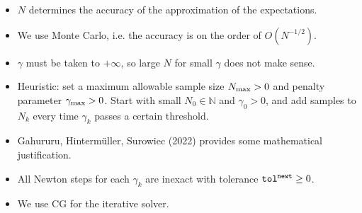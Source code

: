 \documentclass[aspectratio=169,xcolor=dvipsnames,11pt]{beamer}
\begin{document}
\begin{footnotesize}
\begin{frame}

\begin{block}{}
\begin{itemize}
\item $N$ determines the accuracy of the approximation of the expectations.
\item We use Monte Carlo, i.e. the accuracy is on the order of $O(N^{-1/2})$.
\item $\gamma$ must be taken to $+\infty$, so large $N$ for small $\gamma$ does not make sense.
\item Heuristic: set a maximum allowable sample size $N_{\rm max} > 0$ and penalty parameter $\gamma_{\rm max} > 0$. Start with small $N_0 \in \mathbb N$ and $\gamma_0 > 0$, and add samples to $N_k$ every time $\gamma_k$ passes a certain threshold.
\item Gahururu, Hinterm\"uller, Surowiec (2022) provides some mathematical justification.
\item All Newton steps for each $\gamma_k$ are inexact with tolerance ${\tt tol^{newt}} \ge 0$.
\item We use CG for the iterative solver.
\end{itemize}
\end{block}


\end{frame}
\end{footnotesize}
\end{document}
